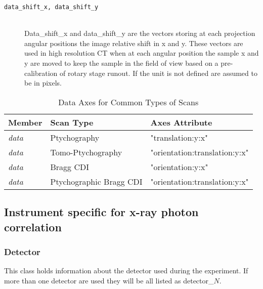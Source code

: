 \begin{description}
\item[ \tt{data\_shift\_x, data\_shift\_y}] \hfill \\
{Data\_shift\_x and data\_shift\_y are the vectors storing at each projection angular positions the image relative shift in x and y.  These vectors are used in high resolution CT when at each angular position the sample x and y are moved to keep the sample in the field of view based on a pre-calibration of rotary stage runout. If the unit is not defined are assumed to be in pixels.}

\end{description}

\begin{table}[h!]\sffamily \footnotesize
\caption{Data Axes for Common Types of Scans}
\centering
{}
\begin{tabular}{l l l}
\toprule
\bfseries Member     & \bfseries Scan Type & \bfseries Axes Attribute \\
\midrule
\emph{data}  & Ptychography & "translation:y:x"  \\
\emph{data}  & Tomo-Ptychography & "orientation:translation:y:x"  \\
\emph{data}  & Bragg CDI & "orientation:y:x"  \\
\emph{data}  & Ptychographic Bragg CDI & "orientation:translation:y:x"  \\
\bottomrule
\end{tabular}
\end{table}




\subsection{Instrument specific for x-ray photon correlation}
\label{instrument:photon}

\subsubsection{Detector}
\label{table:detectorphoton}

This class holds information about the detector used during the experiment. If  more than one detector are used they will be all listed as detector\_$N$.


